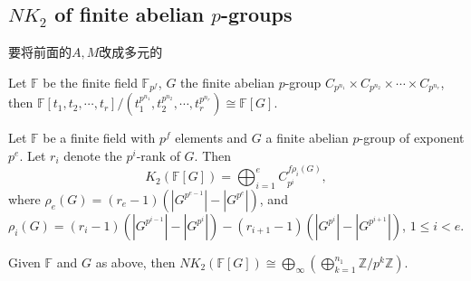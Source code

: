 \subsection{$NK_2$ of finite abelian $p$-groups}
要将前面的$A,M$改成多元的

Let $\mathbb{F}$ be the finite field $\mathbb{F}_{p^f}$, $G$ the finite abelian $p$-group $C_{p^{n_1}}\times C_{p^{n_2}} \times \cdots \times C_{p^{n_r}}$, then $\mathbb{F}[t_1,t_2,\cdots,t_r]/(t_1^{p^{n_1}},t_2^{p^{n_2}},\cdots,t_r^{p^{n_r}})\cong \mathbb{F}[G]$. 
\begin{prop}
\label{thm:gao}
	Let $\mathbb{F}$ be a finite field with $p^f$ elements and $G$ a finite abelian $p$-group of exponent $p^e$. Let $r_i$ denote the $p^i$-rank of $G$. Then
	\[K_2(\mathbb{F}[G]) =\bigoplus_{i=1}^e C_{p^i}^{f\rho_i(G)},\]
	where $\rho_e(G) =(r_e-1)(|G^{p^{e-1}}|-|G^{p^e}|)$, and $\rho_i(G) =(r_i-1)(|G^{p^{i-1}}|-|G^{p^i}|)-(r_{i+1}-1)(|G^{p^{i}}|-|G^{p^{i+1}}|)$, $1\leq i < e$.
\end{prop}
\begin{theorem}
\label{thm:NK2p-group}
	Given $\mathbb{F}$ and $G$ as above, then $NK_2(\mathbb{F}[G])\cong \bigoplus_{\infty}(\bigoplus_{k=1}^{n_1}\mathbb{Z}/p^k\mathbb{Z})$.
\end{theorem}
